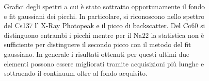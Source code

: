 \documentclass[a4paper]{article}
\begin{document}
\begin{figure}[H]
    \qquad
    \qquad
    \qquad
    \qquad
    \qquad
   \caption{Grafici degli spettri a cui è stato sottratto opportunamente il fondo e fit gaussiani dei picchi. In particolare, si riconoscono nello spettro del Cs137 l' X-Ray Photopeak e il picco di backscatter. Del Co60 si distinguono entrambi i picchi mentre per il Na22 la statistica non è sufficiente per distinguere il secondo picco con il metodo del fit gaussiano. In generale i risultati ottenuti per questi ultimi due elementi possono essere migliorati tramite acquisizioni più lunghe e sottraendo il continuum oltre al fondo acquisito.}%
    \label{fig:1}%
\end{figure}
\end{document}
